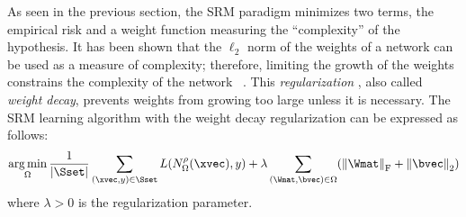 As seen in the previous section, the SRM paradigm minimizes two terms, the empirical risk and a weight function measuring the ``complexity'' of the hypothesis.
It has been shown that the $\ell_2$ norm of the weights of a network can be used as a measure of complexity; therefore, limiting the growth of the weights constrains the complexity of the network ~\cite{hinton1987learning}.
This \emph{regularization} \cite{tikhonov1977solutions,krogh1992simple}, also called \emph{weight decay}, prevents weights from growing too large unless it is necessary.
The SRM learning algorithm with the weight decay regularization can be expressed as follows:
\begin{equation}
  \argmin_{\weights} \frac{1}{|\Sset|} \sum_{(\xvec, y) \in \Sset} L(N^\act_\weights(\xvec), y) + \lambda \sum_{(\Wmat, \bvec) \in \weights} \left( \norm{\Wmat}_\mathrm{F} + \norm{\bvec}_\mathrm{2} \right)
\end{equation}
where $\lambda > 0$ is the regularization parameter.


